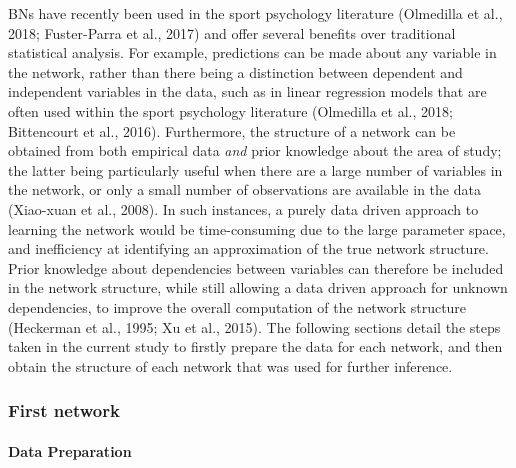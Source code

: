 \documentclass[
]{frontiersHLTH}
\begin{document}
BNs have recently been used in the sport psychology literature
(Olmedilla et al., 2018; Fuster-Parra et al., 2017) and offer several
benefits over traditional statistical analysis. For example, predictions
can be made about any variable in the network, rather than there being a
distinction between dependent and independent variables in the data,
such as in linear regression models that are often used within the sport
psychology literature (Olmedilla et al., 2018; Bittencourt et al.,
2016). Furthermore, the structure of a network can be obtained from both
empirical data \emph{and} prior knowledge about the area of study; the
latter being particularly useful when there are a large number of
variables in the network, or only a small number of observations are
available in the data (Xiao-xuan et al., 2008). In such instances, a
purely data driven approach to learning the network would be
time-consuming due to the large parameter space, and inefficiency at
identifying an approximation of the true network structure. Prior
knowledge about dependencies between variables can therefore be included
in the network structure, while still allowing a data driven approach
for unknown dependencies, to improve the overall computation of the
network structure (Heckerman et al., 1995; Xu et al., 2015). The
following sections detail the steps taken in the current study to
firstly prepare the data for each network, and then obtain the structure
of each network that was used for further inference.

\hypertarget{first-network}{%
\subsubsection{First network}\label{first-network}}

\hypertarget{data-preparation}{%
\paragraph{Data Preparation}\label{data-preparation}}
\end{document}
